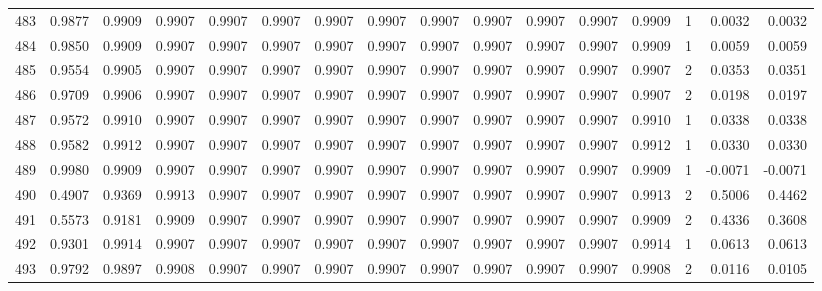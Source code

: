 \begin{tabular}{lrrrrrrrrrrrrrrr}
483 &      0.9877 &  0.9909 &  0.9907 &  0.9907 &  0.9907 &  0.9907 &  0.9907 &  0.9907 &  0.9907 &  0.9907 &   0.9907 &     0.9909 &      1 &                    0.0032 &                     0.0032 \\
484 &      0.9850 &  0.9909 &  0.9907 &  0.9907 &  0.9907 &  0.9907 &  0.9907 &  0.9907 &  0.9907 &  0.9907 &   0.9907 &     0.9909 &      1 &                    0.0059 &                     0.0059 \\
485 &      0.9554 &  0.9905 &  0.9907 &  0.9907 &  0.9907 &  0.9907 &  0.9907 &  0.9907 &  0.9907 &  0.9907 &   0.9907 &     0.9907 &      2 &                    0.0353 &                     0.0351 \\
486 &      0.9709 &  0.9906 &  0.9907 &  0.9907 &  0.9907 &  0.9907 &  0.9907 &  0.9907 &  0.9907 &  0.9907 &   0.9907 &     0.9907 &      2 &                    0.0198 &                     0.0197 \\
487 &      0.9572 &  0.9910 &  0.9907 &  0.9907 &  0.9907 &  0.9907 &  0.9907 &  0.9907 &  0.9907 &  0.9907 &   0.9907 &     0.9910 &      1 &                    0.0338 &                     0.0338 \\
488 &      0.9582 &  0.9912 &  0.9907 &  0.9907 &  0.9907 &  0.9907 &  0.9907 &  0.9907 &  0.9907 &  0.9907 &   0.9907 &     0.9912 &      1 &                    0.0330 &                     0.0330 \\
489 &      0.9980 &  0.9909 &  0.9907 &  0.9907 &  0.9907 &  0.9907 &  0.9907 &  0.9907 &  0.9907 &  0.9907 &   0.9907 &     0.9909 &      1 &                   -0.0071 &                    -0.0071 \\
490 &      0.4907 &  0.9369 &  0.9913 &  0.9907 &  0.9907 &  0.9907 &  0.9907 &  0.9907 &  0.9907 &  0.9907 &   0.9907 &     0.9913 &      2 &                    0.5006 &                     0.4462 \\
491 &      0.5573 &  0.9181 &  0.9909 &  0.9907 &  0.9907 &  0.9907 &  0.9907 &  0.9907 &  0.9907 &  0.9907 &   0.9907 &     0.9909 &      2 &                    0.4336 &                     0.3608 \\
492 &      0.9301 &  0.9914 &  0.9907 &  0.9907 &  0.9907 &  0.9907 &  0.9907 &  0.9907 &  0.9907 &  0.9907 &   0.9907 &     0.9914 &      1 &                    0.0613 &                     0.0613 \\
493 &      0.9792 &  0.9897 &  0.9908 &  0.9907 &  0.9907 &  0.9907 &  0.9907 &  0.9907 &  0.9907 &  0.9907 &   0.9907 &     0.9908 &      2 &                    0.0116 &                     0.0105 \\

\end{tabular}
